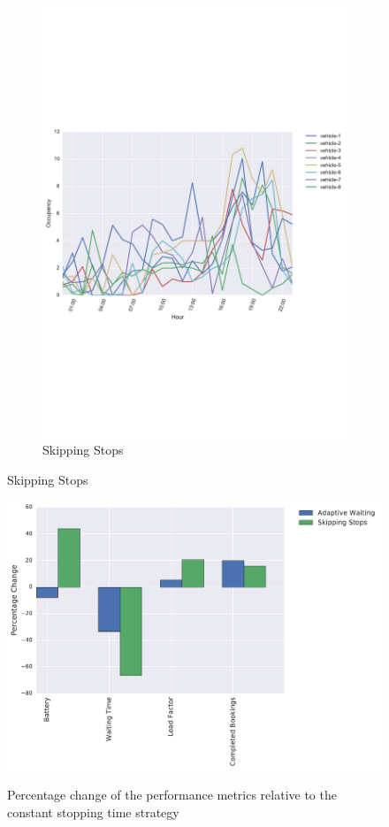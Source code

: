 \documentclass[12pt,a4paper]{article}
\begin{document}
\begin{figure}
{\begin{subfigure}[b]{0.49\textwidth}
  \includegraphics[width=\linewidth]{./images/optionalstops}
  \caption{Skipping Stops}
  \label{skipload}
\end{subfigure}
}
\label{simuload}
\end{figure}

\begin{figure}[h] 
  \centering
  \caption{Percentage change of the performance metrics relative to the constant stopping time strategy}
\includegraphics[scale=0.7]{./images/headwayCompare.pdf}
\label{hwcompare}
\end{figure}
\end{document}
